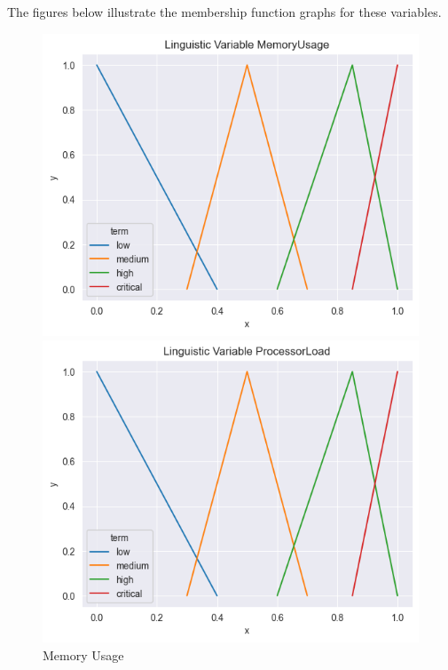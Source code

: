 \documentclass[11pt]{report}
\begin{document}
The figures below illustrate the membership function graphs for these variables.

\begin{figure}[htbp]
    \centering
    \begin{minipage}{0.32\textwidth}
        \centering
        \includegraphics[width=\textwidth]{../images/triangular_MemoryUsage}
        \caption{Memory Usage}
        \label{fig:processor_load}
    \end{minipage}
    \hfill
    \begin{minipage}{0.32\textwidth}
        \centering
        \includegraphics[width=\textwidth]{../images/triangular_ProcessorLoad}

\end{minipage}
\end{figure}
\end{document}
